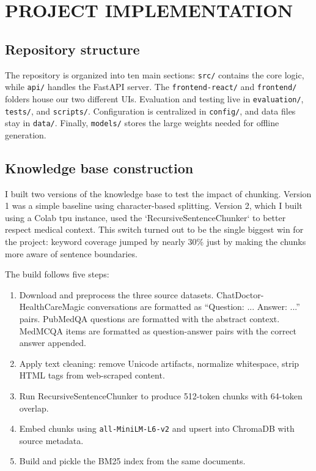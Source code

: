 \chapter{\MakeUppercase{Project Implementation}}

\section{Repository structure}

The repository is organized into ten main sections: 
\texttt{src/} contains the core logic, while \texttt{api/} handles the FastAPI server. The \texttt{frontend-react/} and \texttt{frontend/} folders house our two different UIs. Evaluation and testing live in \texttt{evaluation/}, \texttt{tests/}, and \texttt{scripts/}. Configuration is centralized in \texttt{config/}, and data files stay in \texttt{data/}. Finally, \texttt{models/} stores the large weights needed for offline generation.

\section{Knowledge base construction}

I built two versions of the knowledge base to test the impact of chunking. Version 1 was a simple baseline using character-based splitting. Version 2, which I built using a Colab \ac{tpu} instance, used the `RecursiveSentenceChunker` to better respect medical context. This switch turned out to be the single biggest win for the project: keyword coverage jumped by nearly 30\% just by making the chunks more aware of sentence boundaries.

The build follows five steps:

\begin{enumerate}
    \item Download and preprocess the three source datasets. ChatDoctor-HealthCareMagic conversations are formatted as ``Question: ... Answer: ...'' pairs. PubMedQA questions are formatted with the abstract context. MedMCQA items are formatted as question-answer pairs with the correct answer appended.
    \item Apply text cleaning: remove Unicode artifacts, normalize whitespace, strip HTML tags from web-scraped content.
    \item Run RecursiveSentenceChunker to produce 512-token chunks with 64-token overlap.
    \item Embed chunks using \texttt{all-MiniLM-L6-v2} and upsert into ChromaDB with source metadata.
    \item Build and pickle the BM25 index from the same documents.
\end{enumerate}

